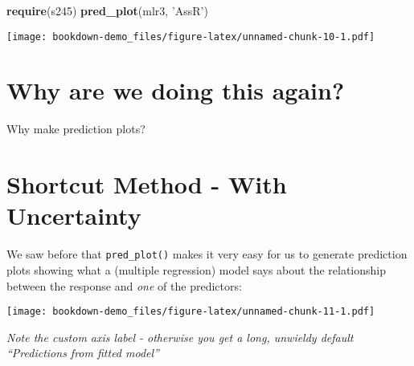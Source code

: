\documentclass[]{book}
\newenvironment{Shaded}{\begin{snugshade}}{\end{snugshade}}
\newcommand{\DataTypeTok}[1]{\textcolor[rgb]{0.13,0.29,0.53}{#1}}
\newcommand{\KeywordTok}[1]{\textcolor[rgb]{0.13,0.29,0.53}{\textbf{#1}}}
\newcommand{\NormalTok}[1]{#1}
\newcommand{\OperatorTok}[1]{\textcolor[rgb]{0.81,0.36,0.00}{\textbf{#1}}}
\newcommand{\StringTok}[1]{\textcolor[rgb]{0.31,0.60,0.02}{#1}}
\begin{document}
\begin{Shaded}
\begin{Highlighting}[]
\KeywordTok{require}\NormalTok{(s245)}
\KeywordTok{pred_plot}\NormalTok{(mlr3, }\StringTok{'AssR'}\NormalTok{)}
\end{Highlighting}
\end{Shaded}

\texttt{[image: bookdown-demo\_files/figure-latex/unnamed-chunk-10-1.pdf]}

\hypertarget{why-are-we-doing-this-again}{%
\section{Why are we doing this again?}\label{why-are-we-doing-this-again}}

Why make prediction plots?

\hypertarget{shortcut-method---with-uncertainty}{%
\section{Shortcut Method - With Uncertainty}\label{shortcut-method---with-uncertainty}}

We saw before that \texttt{pred\_plot()} makes it very easy for us to generate prediction plots showing what a (multiple regression) model says about the relationship between the response and \emph{one} of the predictors:

\begin{Shaded}
\end{Shaded}

\texttt{[image: bookdown-demo\_files/figure-latex/unnamed-chunk-11-1.pdf]}

\emph{Note the custom axis label - otherwise you get a long, unwieldy default ``Predictions from fitted model''}

\begin{Shaded}
\end{Shaded}
\end{document}
